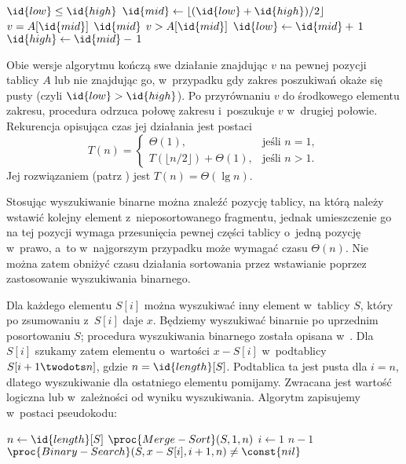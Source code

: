 \begin{codebox}
\li	\While $\id{low}\le\id{high}$
\li		\Do
			$\id{mid}\gets\lfloor(\id{low}+\id{high})/2\rfloor$
\li			\If $v=A[\id{mid}]$
\li				\Then
					\Return $\id{mid}$
				\End
\li			\If $v>A[\id{mid}]$
\li				\Then
					$\id{low}\gets\id{mid}+\,1$
\li				\Else
					$\id{high}\gets\id{mid}-\,1$
				\End
		\End
\li	\Return{}
\end{codebox}

Obie wersje algorytmu  kończą swe działanie znajdując $v$ na pewnej pozycji tablicy $A$ lub nie znajdując go, w~przypadku gdy zakres poszukiwań okaże się pusty (czyli $\id{low}>\id{high}$). Po przyrównaniu $v$ do środkowego elementu zakresu, procedura odrzuca połowę zakresu i~poszukuje $v$ w~drugiej połowie. Rekurencja opisująca czas jej działania jest postaci
\[
	T(n) =
	\begin{cases}
		\Theta(1), & \text{jeśli $n=1$}, \\
		T(\lfloor n/2\rfloor)+\Theta(1), & \text{jeśli $n>1$}.
	\end{cases}
\]
Jej rozwiązaniem (patrz ) jest $T(n)=\Theta(\lg n)$.

\exercise{} %
Stosując wyszukiwanie binarne można znaleźć pozycję tablicy, na którą należy wstawić kolejny element z~nieposortowanego fragmentu, jednak umieszczenie go na tej pozycji wymaga przesunięcia pewnej części tablicy o~jedną pozycję w~prawo, a~to w~najgorszym przypadku może wymagać czasu $\Theta(n)$. Nie można zatem obniżyć czasu działania sortowania przez wstawianie poprzez zastosowanie wyszukiwania binarnego.

\exercise{} %
Dla każdego elementu $S[i]$ można wyszukiwać inny element w~tablicy $S$, który po zsumowaniu z~$S[i]$ daje $x$. Będziemy wyszukiwać binarnie po uprzednim posortowaniu $S$; procedura wyszukiwania binarnego została opisana w~. Dla $S[i]$ szukamy zatem elementu o~wartości $x-S[i]$ w~podtablicy $S[i+1\twodots n]$, gdzie $n=\id{length}[S]$. Podtablica ta jest pusta dla $i=n$, dlatego wyszukiwanie dla ostatniego elementu pomijamy. Zwracana jest wartość logiczna  lub  w~zależności od wyniku wyszukiwania. Algorytm zapisujemy w~postaci pseudokodu:
\begin{codebox}
\li	$n\gets\id{length}[S]$
\li	$\proc{Merge-Sort}(S,1,n)$
\li	\For $i\gets1$ \To $n-1$
\li		\Do
			\If $\proc{Binary-Search}(S,x-S[i],i+1,n)\ne\const{nil}$
\li				\Then
					\Return{}
				\End
		\End
\li	\Return{}
\end{codebox}

